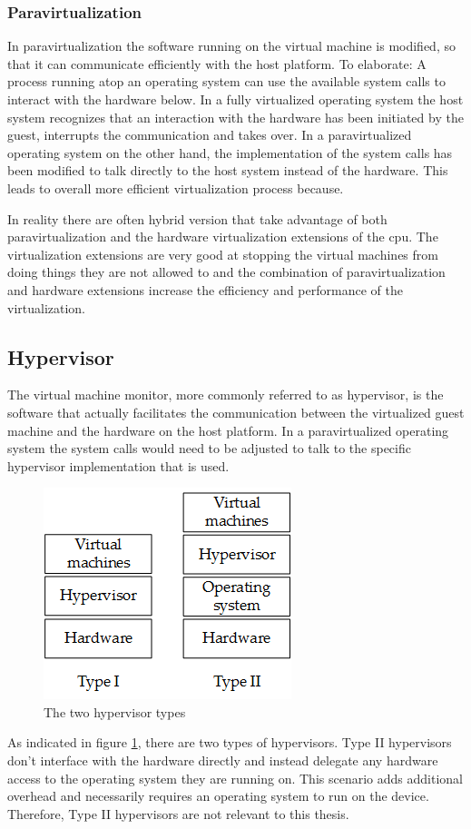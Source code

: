 \subsubsection{Paravirtualization}
In paravirtualization the software running on the virtual machine is modified, so that it can communicate efficiently with the host platform. To elaborate: A process running atop an operating system can use the available system calls to interact with the hardware below. In a fully virtualized operating system the host system recognizes that an interaction with the hardware has been initiated by the guest, interrupts the communication and takes over. In a paravirtualized operating system on the other hand, the implementation of the system calls has been modified to talk directly to the host system instead of the hardware. This leads to overall more efficient virtualization process because.

In reality there are often hybrid version that take advantage of both paravirtualization and the hardware virtualization extensions of the \acrshort{cpu}. The virtualization extensions are very good at stopping the virtual machines from doing things they are not allowed to and the combination of paravirtualization and hardware extensions increase the efficiency and performance of the virtualization.
\subsection{Hypervisor}
The virtual machine monitor, more commonly referred to as hypervisor, is the software that actually facilitates the communication between the virtualized guest machine and the hardware on the host platform. In a paravirtualized operating system the system calls would need to be adjusted to talk to the specific hypervisor implementation that is used. 

\begin{figure}
\centering
\includegraphics[scale=0.75]{Figures/hypervisor_types.png}
\decoRule
\caption{The two hypervisor types}
\label{fig:hypervisor_types}
\end{figure}
As indicated in figure \ref{fig:hypervisor_types}, there are two types of hypervisors. Type II hypervisors don't interface with the hardware directly and instead delegate any hardware access to the operating system they are running on. This scenario adds additional overhead and necessarily requires an operating system to run on the device. Therefore, Type II hypervisors are not relevant to this thesis.

